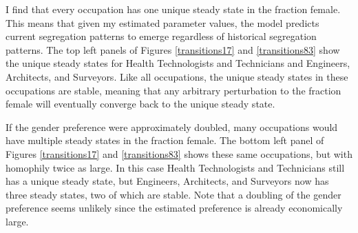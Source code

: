 \documentclass[12pt]{article}
\begin{document}
I find that every occupation has one unique steady state in the fraction female. This means that given my estimated parameter values, the model predicts current segregation patterns to emerge regardless of historical segregation patterns. The top left panels of Figures \ref{transitions17} and \ref{transitions83} show the unique steady states for Health Technologists and Technicians and Engineers, Architects, and Surveyors. Like all occupations, the unique steady states in these occupations are stable, meaning that any arbitrary perturbation to the fraction female will eventually converge back to the unique steady state. 

If the gender preference were approximately doubled, many occupations would have multiple steady states in the fraction female. The bottom left panel of Figures \ref{transitions17} and \ref{transitions83} shows these same occupations, but with homophily twice as large. In this case Health Technologists and Technicians still has a unique steady state, but Engineers, Architects, and Surveyors now has three steady states, two of which are stable. Note that a doubling of the gender preference seems unlikely since the estimated preference is already economically large.





\end{document}
